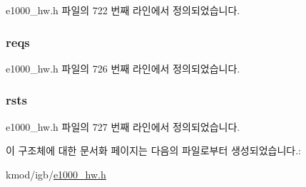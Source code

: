 e1000\+\_\+hw.\+h 파일의 722 번째 라인에서 정의되었습니다.

\subsubsection[{\texorpdfstring{reqs}{reqs}}]{ reqs}\hypertarget{structe1000__mbx__stats_afb6fe57ba409ff31bf032c018b562026}{}\label{structe1000__mbx__stats_afb6fe57ba409ff31bf032c018b562026}


e1000\+\_\+hw.\+h 파일의 726 번째 라인에서 정의되었습니다.

\subsubsection[{\texorpdfstring{rsts}{rsts}}]{ rsts}\hypertarget{structe1000__mbx__stats_ad40e4caa4faf43b31543c3973cbfcf74}{}\label{structe1000__mbx__stats_ad40e4caa4faf43b31543c3973cbfcf74}


e1000\+\_\+hw.\+h 파일의 727 번째 라인에서 정의되었습니다.



이 구조체에 대한 문서화 페이지는 다음의 파일로부터 생성되었습니다.\+:\begin{DoxyCompactItemize}
\item 
kmod/igb/\hyperlink{kmod_2igb_2e1000__hw_8h}{e1000\+\_\+hw.\+h}\end{DoxyCompactItemize}
